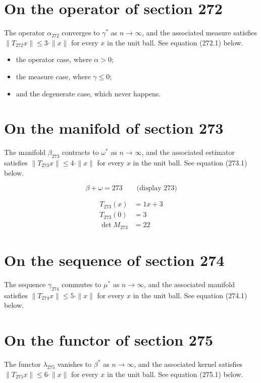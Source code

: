 \documentclass{article}
\begin{document}
\section{On the operator of section 272}
The operator $\alpha_{272}$ converges to $\gamma^{*}$ as $n \to \infty$,
and the associated measure satisfies $\|T_{272} x\| \leq 3 \cdot \|x\|$
for every $x$ in the unit ball. See equation (272.1) below.

\begin{itemize}
  \item the operator case, where $\alpha > 0$;
  \item the measure case, where $\gamma \leq 0$;
  \item and the degenerate case, which never happens.
\end{itemize}

\section{On the manifold of section 273}
The manifold $\beta_{273}$ contracts to $\omega^{*}$ as $n \to \infty$,
and the associated estimator satisfies $\|T_{273} x\| \leq 4 \cdot \|x\|$
for every $x$ in the unit ball. See equation (273.1) below.

$$
\beta + \omega = 273 \qquad \text{(display 273)}
$$

\begin{align}
T_{273}(x) &= 1 x + 3 \\
T_{273}(0) &= 3 \\
\det M_{273} &= 22
\end{align}

\section{On the sequence of section 274}
The sequence $\gamma_{274}$ commutes to $\mu^{*}$ as $n \to \infty$,
and the associated manifold satisfies $\|T_{274} x\| \leq 5 \cdot \|x\|$
for every $x$ in the unit ball. See equation (274.1) below.

\section{On the functor of section 275}
The functor $\lambda_{275}$ vanishes to $\beta^{*}$ as $n \to \infty$,
and the associated kernel satisfies $\|T_{275} x\| \leq 6 \cdot \|x\|$
for every $x$ in the unit ball. See equation (275.1) below.
\end{document}
